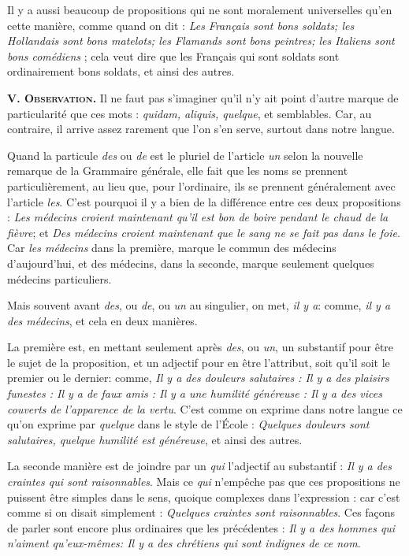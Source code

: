 Il y a aussi beaucoup de propositions qui ne sont moralement universelles qu'en cette manière, comme quand on dit : \emph{Les Français sont bons soldats; les Hollandais sont bons matelots; les Flamands sont bons peintres; les Italiens sont bons comédiens} ; cela veut dire que les Français qui sont soldats sont ordinairement bons soldats, et ainsi des autres.

\bigbreak
{\bfseries\scshape V. Observation.} Il ne faut pas s'imaginer qu'il n'y ait point d'autre marque de particularité que ces mots : \emph{quidam, aliquis, quelque}, et semblables. Car, au contraire, il arrive assez rarement que l'on s'en serve, surtout dans notre langue.

Quand la particule \emph{des} ou \emph{de} est le pluriel de l'article \emph{un} selon la nouvelle remarque de la Grammaire générale, elle fait que les noms se prennent particulièrement, au lieu que, pour l'ordinaire, ils se prennent généralement avec l'article \emph{les}. C'est pourquoi il y a bien de la différence entre ces deux propositions : \emph{Les médecins croient maintenant qu'il est bon de boire pendant le chaud de la fièvre}; et \emph{Des médecins croient maintenant que le sang ne se fait pas dans le foie}. Car \emph{les médecins} dans la première, marque le commun des médecins d'aujourd'hui, et des médecins, dans la seconde, marque seulement quelques médecins particuliers.

Mais souvent avant \emph{des}, ou \emph{de}, ou \emph{un} au singulier, on met, \emph{il y a}: comme, \emph{il y a des médecins}, et cela en deux manières.

La première est, en mettant seulement après \emph{des}, ou \emph{un}, un substantif pour être le sujet de la proposition, et un adjectif pour en être l'attribut, soit qu'il soit le premier ou le dernier: comme, \emph{Il y a des douleurs salutaires : Il y a des plaisirs funestes : Il y a de faux amis : Il y a une humilité généreuse : Il y a des vices couverts de l'apparence de la vertu}. C'est comme on exprime dans notre langue ce qu'on exprime par \emph{quelque} dans le style de l'École : \emph{Quelques douleurs sont salutaires, quelque humilité est généreuse}, et ainsi des autres.

La seconde manière est de joindre par un \emph{qui} l'adjectif au substantif : \emph{Il y a des craintes qui sont raisonnables}. Mais ce \emph{qui} n'empêche pas que ces propositions ne puissent être simples dans le sens, quoique complexes dans l'expression : car c'est comme si on disait simplement : \emph{Quelques craintes sont raisonnables}. Ces façons de parler sont encore plus ordinaires que les précédentes : \emph{Il y a des hommes qui n'aiment qu'eux-mêmes: Il y a des chrétiens qui sont indignes de ce nom}.

